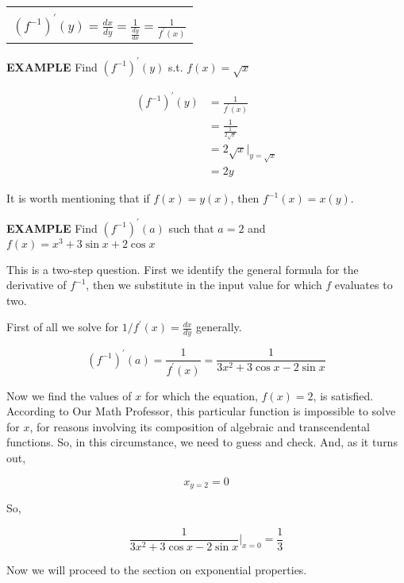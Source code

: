 \documentclass{article}
\begin{document}
\begin{center}
\begin{tabular}{|c|}
\hline\\
$\displaystyle(f^{-1})^\prime(y)=\frac{dx}{dy}=\frac{1}{\frac{dy}{dx}}=\frac{1}{f^\prime(x)}$\\[2em]
\hline
\end{tabular}
\end{center}

{\bf{}EXAMPLE} Find $(f^{-1})^\prime(y)$ s.t. $f(x)=\sqrt{x}$

\begin{align*}
(f^{-1})^\prime(y)&=\frac{1}{f^\prime(x)}\\
&=\frac{1}{\frac{1}{2\sqrt{x}}}\\
&=2\sqrt{x}\big|_{y=\sqrt{x}}\\
&=2y
\end{align*}

It is worth mentioning that if $f(x)=y(x)$, then $f^{-1}(x)=x(y)$.

\vspace{10pt}

{\bf{}EXAMPLE} Find $(f^{-1})^\prime(a)$ such that $a=2$ and $f(x)=x^3+3\sin x+2\cos x$

\vspace{10pt}

This is a two-step question. First we identify the general formula for the derivative of $f^{-1}$, then we substitute in the input value for which $f$ evaluates to two.

\vspace{10pt}

First of all we solve for $1/f^\prime(x)=\frac{dx}{dy}$ generally.

\[(f^{-1})^\prime(a)=\frac{1}{f^\prime(x)}=\frac{1}{3x^2+3\cos x-2\sin x}\]

Now we find the values of $x$ for which the equation, $f(x)=2$, is satisfied. According to Our Math Professor, this particular function is impossible to solve for $x$, for reasons involving its composition of algebraic and transcendental functions. So, in this circumstance, we need to guess and check. And, as it turns out,

\[x_{y=2}=0\]

So,

\[\frac{1}{3x^2+3\cos x-2\sin x}\big|_{x=0}=\frac{1}{3}\]

Now we will proceed to the section on exponential properties.
\end{document}
